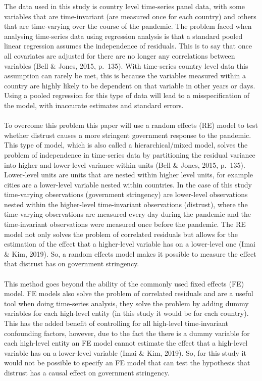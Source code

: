 \documentclass[
  11pt,
]{article}
\begin{document}
The data used in this study is country level time-series panel data, with some variables that are time-invariant (are measured once for each country) and others that are time-varying over the course of the pandemic. The problem faced when analysing time-series data using regression analysis is that a standard pooled linear regression assumes the independence of residuals. This is to say that once all covariates are adjusted for there are no longer any correlations between variables (Bell \& Jones, 2015, p.~135). With time-series country level data this assumption can rarely be met, this is because the variables measured within a country are highly likely to be dependent on that variable in other years or days. Using a pooled regression for this type of data will lead to a misspecification of the model, with inaccurate estimates and standard errors.\\
~\\
To overcome this problem this paper will use a random effects (RE) model to test whether distrust causes a more stringent government response to the pandemic. This type of model, which is also called a hierarchical/mixed model, solves the problem of independence in time-series data by partitioning the residual variance into higher and lower-level variance within units (Bell \& Jones, 2015, p.~135). Lower-level units are units that are nested within higher level units, for example cities are a lower-level variable nested within countries. In the case of this study time-varying observations (government stringency) are lower-level observations nested within the higher-level time-invariant observations (distrust), where the time-varying observations are measured every day during the pandemic and the time-invariant observations were measured once before the pandemic. The RE model not only solves the problem of correlated residuals but allows for the estimation of the effect that a higher-level variable has on a lower-level one (Imai \& Kim, 2019). So, a random effects model makes it possible to measure the effect that distrust has on government stringency.\\
~\\
This method goes beyond the ability of the commonly used fixed effects (FE) model. FE models also solve the problem of correlated residuals and are a useful tool when doing time-series analysis, they solve the problem by adding dummy variables for each high-level entity (in this study it would be for each country). This has the added benefit of controlling for all high-level time-invariant confounding factors, however, due to the fact the there is a dummy variable for each high-level entity an FE model cannot estimate the effect that a high-level variable has on a lower-level variable (Imai \& Kim, 2019). So, for this study it would not be possible to specify an FE model that can test the hypothesis that distrust has a causal effect on government stringency.\\
\end{document}
